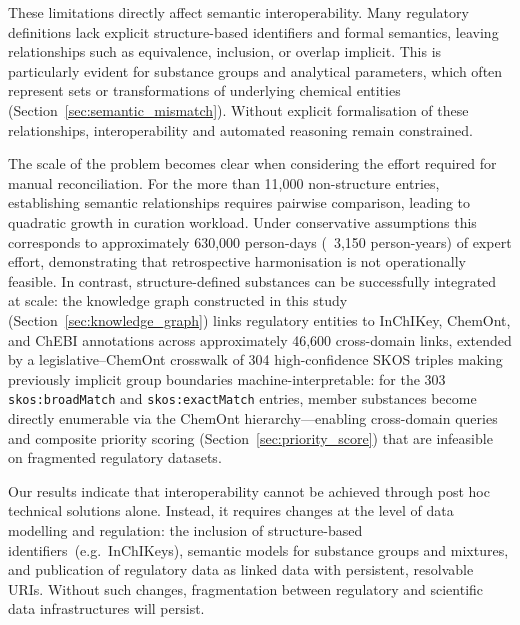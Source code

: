 These limitations directly affect semantic interoperability. Many regulatory definitions lack explicit structure-based identifiers and formal semantics, leaving relationships such as equivalence, inclusion, or overlap implicit. This is particularly evident for substance groups and analytical parameters, which often represent sets or transformations of underlying chemical entities (Section~\ref{sec:semantic_mismatch}). Without explicit formalisation of these relationships, interoperability and automated reasoning remain constrained.

The scale of the problem becomes clear when considering the effort required for manual reconciliation. For the more than 11,000 non-structure entries, establishing semantic relationships requires pairwise comparison, leading to quadratic growth in curation workload. Under conservative assumptions this corresponds to approximately 630,000 person-days (~3,150 person-years) of expert effort, demonstrating that retrospective harmonisation is not operationally feasible. In contrast, structure-defined substances can be successfully integrated at scale: the knowledge graph constructed in this study (Section~\ref{sec:knowledge_graph}) links regulatory entities to InChIKey, ChemOnt, and ChEBI annotations across approximately 46,600 cross-domain links, extended by a legislative--ChemOnt crosswalk of 304 high-confidence SKOS triples making previously implicit group boundaries machine-interpretable: for the 303 \texttt{skos:broadMatch} and \texttt{skos:exactMatch} entries, member substances become directly enumerable via the ChemOnt hierarchy---enabling cross-domain queries and composite priority scoring (Section~\ref{sec:priority_score}) that are infeasible on fragmented regulatory datasets.

Our results indicate that interoperability cannot be achieved through post hoc technical solutions alone. Instead, it requires changes at the level of data modelling and regulation: the inclusion of structure-based identifiers~(e.g.~InChIKeys), semantic models for substance groups and mixtures, and publication of regulatory data as linked data with persistent, resolvable URIs. Without such changes, fragmentation between regulatory and scientific data infrastructures will persist.

